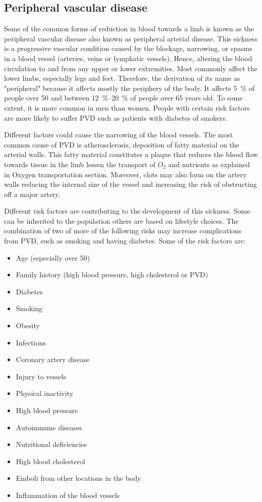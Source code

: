 \subsection{Peripheral vascular disease}
\label{section2.2.1}
Some of the common forms of reduction in blood towards a limb is known as the peripheral vascular disease also known as peripheral arterial disease. This sickness is a progressive vascular condition caused by the blockage, narrowing, or spasms in a blood vessel (arteries, veins or lymphatic vessels). Hence, altering the blood circulation to and from any upper or lower extremities.  Most commonly affect the lower limbs, especially legs and feet. Therefore, the derivation of its name as "peripheral" because it affects mostly the periphery of the body. It affects \SI{5}{\percent} of people over \num{50} and between \SIrange{12}{20}{\percent} of people over 65 years old. To some extent, it is more common in men than women. People with certain risk factors are more likely to suffer PVD such as patients with diabetes of smokers.  

Different factors could cause the narrowing of the blood vessels. The most common cause of PVD is atherosclerosis, deposition of fatty material on the arterial walls. This fatty material constitutes a plaque that reduces the blood flow towards tissue in the limb lessen the transport of $O_2$ and nutrients as explained in Oxygen transportation section. Moreover, clots may also form on the artery walls reducing the internal size of the vessel and increasing the risk of obstructing off a major artery. 

Different risk factors are contributing to the development of this sickness. Some can be inherited to the population others are based on lifestyle choices. The combination of two of more of the following risks may increase complications from PVD, such as smoking and having diabetes. Some of the risk factors are:

\begin{itemize}[noitemsep]
    \item Age (especially over \num{50})
    \item Family history (high blood pressure, high cholesterol or PVD)
    \item Diabetes
    \item Smoking
    \item Obesity
    \item Infections
    \item Coronary artery disease
    \item Injury to vessels
    \item Physical inactivity
    \item High blood pressure
    \item Autoimmune diseases
    \item Nutritional deficiencies
    \item High blood cholesterol
    \item Emboli from other locations in the body
    \item Inflammation of the blood vessels
\end{itemize}

